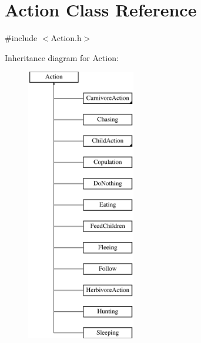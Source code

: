 \hypertarget{class_action}{}\section{Action Class Reference}
\label{class_action}


{\ttfamily \#include $<$Action.\+h$>$}

Inheritance diagram for Action\+:\begin{figure}[H]
\begin{center}
\leavevmode
\includegraphics[height=12.000000cm]{class_action}
\end{center}
\end{figure}
